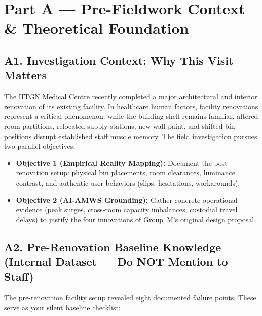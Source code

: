 \documentclass[11pt,a4paper]{article}
\begin{document}
\section{Part A --- Pre-Fieldwork Context \& Theoretical Foundation}

\subsection{A1. Investigation Context: Why This Visit Matters}
The IITGN Medical Centre recently completed a major architectural and interior renovation of its existing facility. In healthcare human factors, facility renovations represent a critical phenomenon: while the building shell remains familiar, altered room partitions, relocated supply stations, new wall paint, and shifted bin positions disrupt established staff muscle memory. 
The field investigation pursues two parallel objectives:
\begin{itemize}[leftmargin=*, nosep]
    \item \textbf{Objective 1 (Empirical Reality Mapping):} Document the post-renovation setup: physical bin placements, room clearances, luminance contrast, and authentic user behaviors (slips, hesitations, workarounds).
    \item \textbf{Objective 2 (AI-AMWS Grounding):} Gather concrete operational evidence (peak surges, cross-room capacity imbalances, custodial travel delays) to justify the four innovations of Group~M's original design proposal.
\end{itemize}

\subsection{A2. Pre-Renovation Baseline Knowledge (Internal Dataset --- Do NOT Mention to Staff)}
The pre-renovation facility setup revealed eight documented failure points. These serve as your silent baseline checklist:
\end{document}
